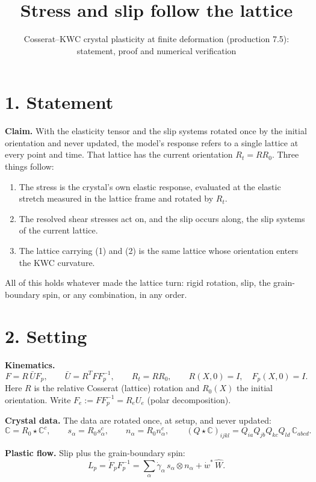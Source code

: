 \documentclass[
  11pt,
]{article}
\title{Stress and slip follow the lattice}
\subtitle{Cosserat--KWC crystal plasticity at finite deformation
(production 7.5): statement, proof and numerical verification}
\author{}
\date{}
\providecommand{\tightlist}{%
  \setlength{\itemsep}{0pt}\setlength{\parskip}{0pt}}
\begin{document}
\maketitle

\hypertarget{statement}{%
\section{1. Statement}\label{statement}}

\textbf{Claim.} With the elasticity tensor and the slip systems rotated
once by the initial orientation and never updated, the model's response
refers to a single lattice at every point and time. That lattice has the
current orientation \(R_t = RR_0\). Three things follow:

\begin{enumerate}
\def\labelenumi{\arabic{enumi}.}
\tightlist
\item
  The stress is the crystal's own elastic response, evaluated at the
  elastic stretch measured in the lattice frame and rotated by \(R_t\).
\item
  The resolved shear stresses act on, and the slip occurs along, the
  slip systems of the current lattice.
\item
  The lattice carrying (1) and (2) is the same lattice whose orientation
  enters the KWC curvature.
\end{enumerate}

All of this holds whatever made the lattice turn: rigid rotation, slip,
the grain-boundary spin, or any combination, in any order.

\hypertarget{setting}{%
\section{2. Setting}\label{setting}}

\textbf{Kinematics.}
\[F=R\,\bar U F_p,\qquad \bar U=R^TFF_p^{-1},\qquad R_t=RR_0,\qquad R(X,0)=I,\quad F_p(X,0)=I .\]
Here \(R\) is the relative Cosserat (lattice) rotation and \(R_0(X)\)
the initial orientation. Write \(F_e:=FF_p^{-1}=R_eU_e\) (polar
decomposition).

\textbf{Crystal data.} The data are rotated once, at setup, and never
updated:
\[\mathbb C=R_0\star\mathbb C^{c},\qquad s_\alpha=R_0s^c_\alpha,\qquad n_\alpha=R_0n^c_\alpha,\qquad (Q\star\mathbb C)_{ijkl}=Q_{ia}Q_{jb}Q_{kc}Q_{ld}\,\mathbb C_{abcd}.\]

\textbf{Plastic flow.} Slip plus the grain-boundary spin:
\[L_p=\dot F_pF_p^{-1}=\sum_\alpha\dot\gamma_\alpha\,s_\alpha\otimes n_\alpha+\dot w^*\,\widehat W .\]
\end{document}
